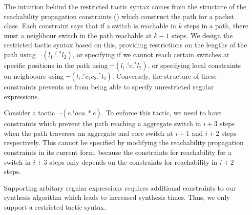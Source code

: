 The intuition behind the restricted tactic syntax comes from the structure of the reachability propagation 
constraints () which construct the path for a packet class. Each constraint says that if a switch is reachable in $k$ steps in a path,
 there must a neighbour switch in the path reachable at $k-1$ steps. We design the restricted tactic syntax based
  on this, providing restrictions on the lengths of the path using $\neg (l_1 .^i .^* l_2)$, or specifying if we cannot 
  reach certain switches at specific positions in the path using  $\neg (l_1 .^i c .^* l_2)$. or specifying local 
  constraints on neighbours using $\neg (l_1  .^i c_1 c_2 .^* l_2)$.  
  Conversely, the structure of these constraints 
  prevents us from being able to specify unrestricted regular expressions. 
  \begin{example}
  Consider a tactic $\neg(e .^i a c a .*e)$. To enforce
  this tactic, we need to have constraints which prevent the path reaching a aggregate switch in $i+3$
  steps when the path traverses an aggregate and core switch at $i+1$ and $i+2$ steps
  respectively. This cannot be specified by modifying the reachability propagation 
  constraints in its current form, 
  because the constraints for reachability for a switch in $i + 3$ steps only depends on 
  the constraints for reachability in $i+2$ steps. 
   \end{example}
   Supporting arbitary regular expressions
   requires additional constraints to our synthesis algorithm which leads to increased synthesis times. Thus, we only support a restricted tactic syntax.   

